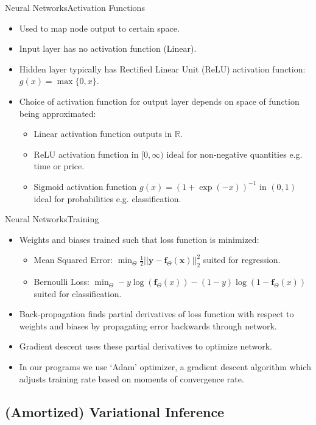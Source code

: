 \documentclass{beamer}
\newcommand{\R}{\mathbb{R}}
\begin{document}
\begin{frame}{Neural Networks}{Activation Functions}
\begin{itemize}
\item Used to map node output to certain space.
\item Input layer has no activation function (Linear).
\item Hidden layer typically has Rectified Linear Unit (ReLU) activation function: $g(x)=\max\{0,x\}$.
\item Choice of activation function for output layer depends on space of function being approximated:
\begin{itemize}
\item Linear activation function outputs in $\R$.
\item ReLU activation function in $[0,\infty)$ ideal for non-negative quantities e.g. time or price.
\item Sigmoid activation function $g(x)=(1+\exp(-x))^{-1}$ in $(0,1)$ ideal for probabilities e.g. classification.
\end{itemize}
\end{itemize}
\end{frame}
\begin{frame}{Neural Networks}{Training}
\begin{itemize}
\item Weights and biases trained such that loss function is minimized:
\begin{itemize}
\item Mean Squared Error: $\min_\Theta \frac{1}{2}||\bm{y}-\bm{f}_\Theta(\bm{x})||^2_2$ suited for regression.
\item Bernoulli Loss: $\min_\Theta -y\log (\bm{f}_\Theta(x))-(1-y)\log(1-\bm{f}_\Theta(x))$ suited for classification.
\end{itemize}
\item Back-propagation finds partial derivatives of loss function with respect to weights and biases by propagating error backwards through network.
\item Gradient descent uses these partial derivatives to optimize network.
\item In our programs we use `Adam' optimizer, a gradient descent algorithm which adjusts training rate based on moments of convergence rate.
\end{itemize}
\end{frame}
\subsection{(Amortized) Variational Inference}
\end{document}
